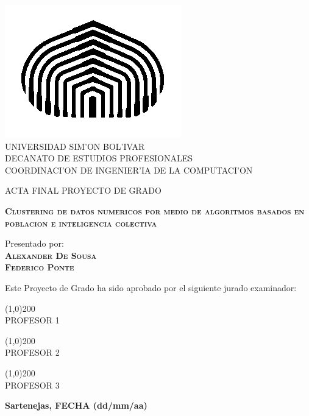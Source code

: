 \begin{titlepage}
\begin{center}

\includegraphics[scale=0.5,type=png,ext=.png,read=.png]{figures/cebolla} \\

\textsc {\large UNIVERSIDAD SIM'ON BOL'IVAR} \\
\textsc{DECANATO DE ESTUDIOS PROFESIONALES\\
COORDINACI'ON DE INGENIER'IA DE LA COMPUTACI'ON}

\bigskip
\bigskip
\bigskip
\bigskip
\bigskip
\bigskip

\textsc{ACTA FINAL PROYECTO DE GRADO}

\bigskip
\bigskip

\textsc{\bfseries Clustering de datos numericos por medio de algoritmos basados en poblacion e inteligencia colectiva}

\bigskip
\bigskip
\bigskip
\bigskip

\begin{minipage}{\textwidth}
\centering
Presentado por: \\
\textsc{\bfseries Alexander De Sousa} \\
\textsc{\bfseries Federico Ponte} \\

\bigskip
\bigskip
\bigskip
\bigskip

Este Proyecto de Grado ha sido aprobado por el siguiente jurado examinador: \\

\bigskip
\bigskip

\line(1,0){200} \\
PROFESOR 1\\

\bigskip
\bigskip

\line(1,0){200} \\
PROFESOR 2 \\

\bigskip
\bigskip

\line(1,0){200} \\
PROFESOR 3 \\
\end{minipage}

\bigskip
\bigskip
\vfill

{\large \bfseries Sartenejas, FECHA (dd/mm/aa)}

\end{center}
\end{titlepage}
